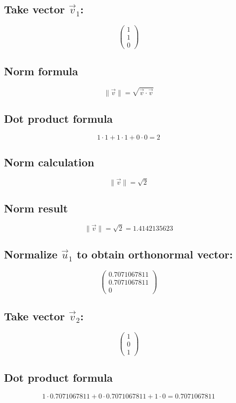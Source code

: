 \documentclass{article}
\begin{document}
\subsection*{ \vspace{1em} Take vector \(\vec{v}_{1}\):}
\[
\begin{pmatrix}1 \\ 1 \\ 0\end{pmatrix}
\]
\subsection*{ \vspace{1em} Norm formula}
\[
\|\vec{v}\| = \sqrt{\vec{v} \cdot \vec{v}}
\]
\subsection*{ \vspace{1em} Dot product formula}
\[
1 \cdot 1 + 1 \cdot 1 + 0 \cdot 0 = 2
\]
\subsection*{ \vspace{1em} Norm calculation}
\[
\|\vec{v}\| = \sqrt{2}
\]
\subsection*{ \vspace{1em} Norm result}
\[
\|\vec{v}\| = \sqrt{2} = 1.4142135623
\]
\subsection*{ \vspace{1em} Normalize \(\vec{u}_{1}\) to obtain orthonormal vector:}
\[
\begin{pmatrix}0.7071067811 \\ 0.7071067811 \\ 0\end{pmatrix}
\]
\subsection*{ \vspace{1em} Take vector \(\vec{v}_{2}\):}
\[
\begin{pmatrix}1 \\ 0 \\ 1\end{pmatrix}
\]
\subsection*{ \vspace{1em} Dot product formula}
\[
1 \cdot 0.7071067811 + 0 \cdot 0.7071067811 + 1 \cdot 0 = 0.7071067811
\]
\end{document}
